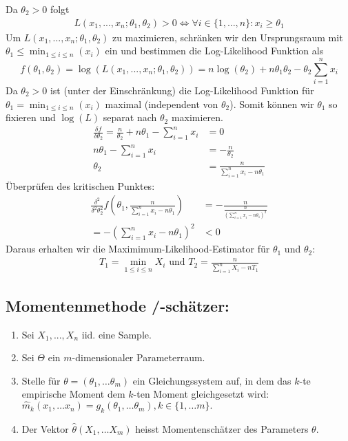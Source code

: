 Da $\theta_2 > 0$ folgt 
\begin{align*}
    L(x_1, ..., x_n; \theta_1, \theta_2) > 0 \iff \forall i \in \{1, \dots, n\}: x_i \geq \theta_1
\end{align*}
Um $L(x_1, ..., x_n; \theta_1, \theta_2)$ zu maximieren, schränken wir den Ursprungsraum mit $\theta_1 \leq \min_{1 \leq i \leq n}(x_i)$ ein 
und bestimmen die Log-Likelihood Funktion als
$$f(\theta_1, \theta_2) = \log\left(L(x_1, ..., x_n; \theta_1, \theta_2)\right) = n \log(\theta_2) + n \theta_1\theta_2 - \theta_2 \sum_{i = 1}^n x_i$$
Da $\theta_2 > 0$ ist (unter der Einschränkung) die Log-Likelihood Funktion für $\theta_1 = \min_{1 \leq i \leq n}(x_i)$ maximal (independent von $\theta_2$).
Somit können wir $\theta_1$ so fixieren und $\log(L)$ separat nach $\theta_2$ maximieren. 
\begin{align*}
    \frac{\delta f}{\delta \theta_2} = \frac{n}{\theta_2} + n\theta_1 - \sum_{i = 1}^n x_i&= 0\\
    n\theta_1 - \sum_{i = 1}^n x_i&= -\frac{n}{\theta_2}\\
    \theta_2 &= \frac{n}{\sum_{i = 1}^n x_i - n \theta_1}
\end{align*}
Überprüfen des kritischen Punktes:
\begin{align*}
     \frac{\delta^2}{\delta^2\theta_2^2}f\left(\theta_1, \frac{n}{\sum_{i = 1}^n x_i - n\theta_1}\right) &= -\frac{n}{\frac{n}{\left(\sum_{i = 1}^n x_i - n\theta_1\right)^2}}\\
     = -\left(\sum_{i = 1}^n x_i - n \theta_1\right)^2 &< 0
\end{align*}
Daraus erhalten wir die Maximimum-Likelihood-Estimator für $\theta_1$ und $\theta_2$:
\begin{align*}
    T_1 = \min_{1\leq i \leq n}X_i \text{ und } T_2 = \frac{n}{\sum_{i=1}^n X_i - nT_1}
\end{align*}

\subsection{Momentenmethode /-schätzer:} 
\begin{enumerate}
	\item Sei $X_1, ..., X_n$ iid. eine Sample. 
	\item Sei $\Theta$ ein $m$-dimensionaler Parameterraum. 
	\item Stelle für $\theta = (\theta_1,\dots \theta_m)$ ein Gleichungssystem auf, in dem das $k$-te empirische Moment dem $k$-ten Moment gleichgesetzt wird: $\hat m_k(x_1,\dots x_n) = g_k(\theta_1,\dots \theta_m), k \in \{1,\dots m\}.$ 
	\item Der Vektor $\hat \theta(X_1,\dots X_m)$ heisst Momentenschätzer des Parameters $\theta.$ 
\end{enumerate}
